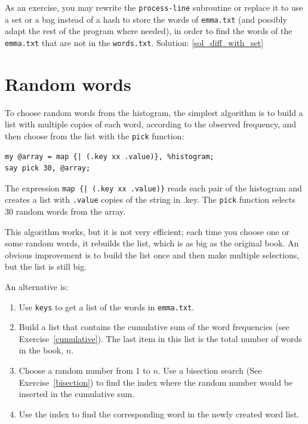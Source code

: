 \label{diff_with_set}
As an exercise, you may rewrite the {\tt process-line} 
subroutine or replace it to use a set or a bag instead of a hash 
to store the words of \verb'emma.txt' (and possibly adapt the rest of 
the program where needed), in order to find the words of the \verb'emma.txt' 
that are not in the \verb'words.txt'.
Solution: \ref{sol_diff_with_set}


\section{Random words}
\label{randomwords}

To choose random words from the histogram, the simplest algorithm
is to build a list with multiple copies of each word, according
to the observed frequency, and then choose from the list with the 
\verb'pick' function:

\begin{verbatim}
my @array = map {| (.key xx .value)}, %histogram;
say pick 30, @array;
\end{verbatim}
%
The expression \verb'map {| (.key xx .value)}' reads each 
pair of the histogram and creates a list with {\tt .value} 
copies of the string in {.key}.  The {\tt pick} function 
selects 30 random words from the array.

This algorithm works, but it is not very efficient; each time you
choose one or some random words, it rebuilds the list, which is 
as big as the original book.  An obvious improvement is to build 
the list once and then make multiple selections, but the list 
is still big.

An alternative is:

\begin{enumerate}

\item Use {\tt keys} to get a list of the words in \verb'emma.txt'.

\item Build a list that contains the cumulative sum of the word
  frequencies (see Exercise~\ref{cumulative}).  The last item
  in this list is the total number of words in the book, $n$.
  
\item Choose a random number from 1 to $n$.  Use a bisection search
  (See Exercise~\ref{bisection}) to find the index where the random
  number would be inserted in the cumulative sum.

\item Use the index to find the corresponding word in the newly 
created word list.

\end{enumerate}

